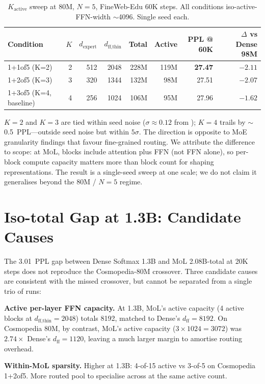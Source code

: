 \documentclass[10pt]{article}
\newcommand{\mol}{\textsc{MoL}}
\begin{document}
\begin{table}[h]
\centering\small
\caption{$K_\textrm{active}$ sweep at 80M, $N{=}5$, FineWeb-Edu 60K steps. All conditions iso-active-FFN-width $\sim$4096. Single seed each.}
\label{tab:kactive}
\begin{tabular}{lrrrrrrr}
\toprule
Condition & $K$ & $d_\textrm{expert}$ & $d_\textrm{ff,thin}$ & Total & Active & PPL @ 60K & $\Delta$ vs Dense 98M \\
\midrule
1+1of5 (K=2)            & 2 & 512 & 2048 & 228M & 119M & \textbf{27.47} & $-2.11$ \\
1+2of5 (K=3)            & 3 & 320 & 1344 & 132M &  98M & 27.51 & $-2.07$ \\
1+3of5 (K=4, baseline)  & 4 & 256 & 1024 & 106M &  95M & 27.96 & $-1.62$ \\
\bottomrule
\end{tabular}
\end{table}

$K{=}2$ and $K{=}3$ are tied within seed noise ($\sigma{\approx}0.12$ from ); $K{=}4$ trails by $\sim$0.5~PPL—outside seed noise but within $5\sigma$. The direction is opposite to MoE granularity findings \citep{deepseekmoe2024} that favour fine-grained routing. We attribute the difference to scope: at \mol{}, blocks include attention plus FFN (not FFN alone), so per-block compute capacity matters more than block count for shaping representations. The result is a single-seed sweep at one scale; we do not claim it generalises beyond the 80M / $N{=}5$ regime.

\section{Iso-total Gap at 1.3B: Candidate Causes}
\label{app:isototal}

The 3.01~PPL gap between Dense Softmax 1.3B and \mol{} 2.08B-total at 20K steps does not reproduce the Cosmopedia-80M crossover. Three candidate causes are consistent with the missed crossover, but cannot be separated from a single trio of runs:

\textbf{Active per-layer FFN capacity.} At 1.3B, \mol{}'s active capacity (4 active blocks at $d_\textrm{ff,thin}{=}2048$) totals 8192, matched to Dense's $d_\textrm{ff}{=}8192$. On Cosmopedia 80M, by contrast, \mol{}'s active capacity ($3 \times 1024 = 3072$) was $2.74\times$ Dense's $d_\textrm{ff}{=}1120$, leaving a much larger margin to amortise routing overhead.

\textbf{Within-\mol{} sparsity.} Higher at 1.3B: 4-of-15 active vs 3-of-5 on Cosmopedia 1+2of5. More routed pool to specialise across at the same active count.
\end{document}
